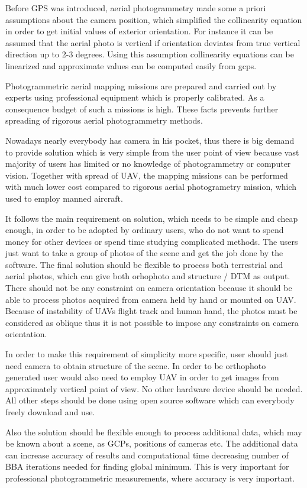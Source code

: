 \documentclass[a4paper,12pt]{article}
\begin{document}
Before GPS was introduced, aerial photogrammetry made some a priori assumptions about the camera position,
which simplified the collinearity equation in order to get initial values of exterior orientation. 
For instance it can be assumed that the aerial photo is vertical if orientation deviates from true vertical
direction up to 2-3 degrees. Using this assumption collinearity equations can be linearized and 
approximate values can be computed easily from gcps.

Photogrammetric aerial mapping missions are prepared and carried out by experts using 
professional equipment which is properly calibrated.
As a consequence budget of such a missions
is high. These facts prevents further spreading of rigorous aerial photogrammetry methods.

Nowadays nearly everybody has camera in his pocket, thus there is big demand 
to provide solution which is very simple from the user point of view because 
vast majority of users has limited or no knowledge of photogrammetry or computer vision. 
Together with spread of UAV, the mapping missions can be performed with much lower 
cost compared to rigorous aerial photogrametry mission, which used to employ manned aircraft.

It follows the main requirement 
on solution, which needs to be simple and cheap enough,
in order to be adopted by
ordinary users, who do not want 
to spend money for other devices or spend time studying complicated methods. 
The users just 
want to take a group of photos of the scene and get the job done by the software.
The final solution should be flexible to process both terrestrial and aerial photos,
which can give both orhophoto and structure / DTM as output. There should 
not be any constraint on camera orientation because it should be able 
to process photos acquired from camera held by hand or mounted on UAV.
Because of instability of  UAVs flight track and human hand, the photos 
must be considered as oblique thus it is not possible to impose any constraints on camera orientation. 

In order to make this requirement of simplicity more specific, user should just need  
 camera to obtain structure of the scene. 
 In order to be orthophoto generated 
user would also need to employ UAV in order to get images from approximately vertical point of view.
No other hardware device should be needed. 
All other steps should be done 
using open source software which can everybody freely download and use. 

Also the solution should be flexible enough to process additional data, which may be known about a scene, 
as GCPs, positions of cameras etc. The additional data can
 increase accuracy of results and computational time  
 decreasing number of  BBA iterations needed for finding global minimum. This is very important 
 for professional photogrammetric measurements, where accuracy is very important.
\end{document}
